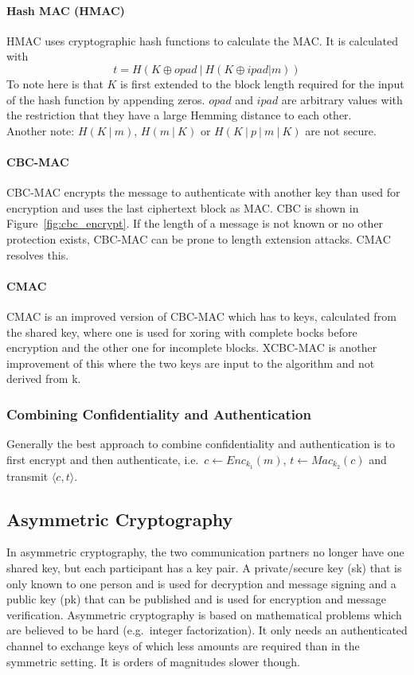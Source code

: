 \paragraph{Hash MAC (HMAC)}
HMAC uses cryptographic hash functions to calculate the MAC\@.
It is calculated with
\begin{equation*}
  t = H(K \oplus opad~|~H(K \oplus ipad | m))
\end{equation*}
To note here is that $K$ is first extended to the block length required for the input of the hash function by appending zeros.
$opad$ and $ipad$ are arbitrary values with the restriction that they have a large Hemming distance to each other.\\
Another note: $H(K~|~m)$, $H(m~|~K)$ or $H(K~|~p~|~m~|~K)$ are not secure.

\paragraph{CBC-MAC}
CBC-MAC encrypts the message to authenticate with another key than used for encryption and uses the last ciphertext block as MAC\@.
CBC is shown in Figure~\ref{fig:cbc_encrypt}.
If the length of a message is not known or no other protection exists, CBC-MAC can be prone to length extension attacks.
CMAC resolves this.

\paragraph{CMAC}
CMAC is an improved version of CBC-MAC which has to keys, calculated from the shared key, where one is used for xoring with complete bocks before encryption and the other one for incomplete blocks.
XCBC-MAC is another improvement of this where the two keys are input to the algorithm and not derived from k.

\subsubsection{Combining Confidentiality and Authentication}
Generally the best approach to combine confidentiality and authentication is to first encrypt and then authenticate, i.e.\ $c \leftarrow Enc_{k_1}(m)$, $t \leftarrow Mac_{k_2}(c)$ and transmit $\langle c,t \rangle$.

\subsection{Asymmetric Cryptography}
In asymmetric cryptography, the two communication partners no longer have one shared key, but each participant has a key pair.
A private/secure key (sk) that is only known to one person and is used for decryption and message signing and a public key (pk) that can be published and is used for encryption and message verification.
Asymmetric cryptography is based on mathematical problems which are believed to be hard (e.g.\ integer factorization).
It only needs an authenticated channel to exchange keys of which less amounts are required than in the symmetric setting.
It is orders of magnitudes slower though.

